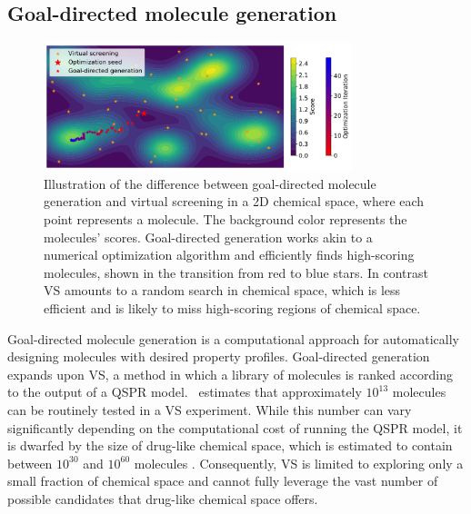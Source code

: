 \subsection{Goal-directed molecule generation}
\begin{figure}
      \centering
      \includegraphics[width=0.8\textwidth]{./figures/goal_directed_generation_vs.pdf}
      \caption{Illustration of the difference between goal-directed molecule generation and virtual
            screening in a 2D chemical space, where each point represents a molecule. The
            background color represents the molecules' scores. Goal-directed generation works
            akin to a numerical optimization algorithm and efficiently finds high-scoring molecules,
            shown in the transition from red to blue stars. In contrast VS amounts to a random search in chemical space, which is less efficient
            and is likely to miss high-scoring regions of chemical space. \label{fig:goal-directed-generation}}
\end{figure}

Goal-directed molecule generation \citep{schneiderNovoMolecularDesign2013} is a computational
approach for automatically designing molecules with desired property profiles. Goal-directed
generation expands upon \ac{VS}, a method in which a library of molecules is ranked according to the
output of a \ac{QSPR} model.\ \citet{waltersVirtualChemicalLibraries2019} estimates that
approximately $10^{13}$ molecules can be routinely tested in a \ac{VS} experiment. While this number
can vary significantly depending on the computational cost of running the \ac{QSPR} model, it is
dwarfed by the size of drug-like chemical space, which is estimated to contain between $10^{30}$ and
$10^{60}$ molecules \citep{waltersVirtualChemicalLibraries2019,ruddigkeitEnumeration166Billion2012}.
Consequently, \ac{VS} is limited to exploring only a small fraction of chemical space and cannot
fully leverage the vast number of possible candidates that drug-like chemical space offers.

